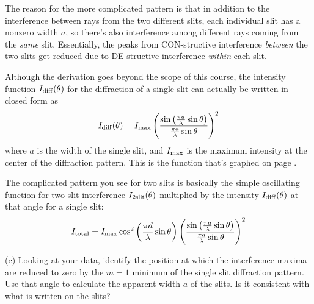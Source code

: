 The reason for the more complicated pattern is that in addition to the interference between rays from the two different slits, each individual slit has a nonzero width $a$, so there's also interference among different rays coming from the \textit{same} slit.  Essentially, the peaks from CON-structive interference \textit{between} the two slits get reduced due to DE-structive interference \textit{within} each slit.

\pagebreak[2]
Although the derivation goes beyond the scope of this course, the intensity function $I_{\rm{diff}}(\theta)$ for the diffraction of a single slit can actually be written in closed form as
\begin{displaymath} 
I_{\rm{diff}}(\theta) = I_{\rm{max}} \left( \frac {\sin \left(\frac {\pi a} {\lambda} \sin \theta \right)} {\frac {\pi a} {\lambda} \sin \theta} \right)^2 
\end{displaymath}
where $a$ is the width of the single slit, 
and $I_{\rm{max}}$
is the maximum intensity at the center of the diffraction pattern.  This is the function that's graphed on page \pageref{fraunhofer_graph}.




The complicated pattern you see for two slits is basically the simple oscillating function for two slit interference $I_{\rm 2slit}(\theta)$ multiplied by the intensity $I_{\rm{diff}}(\theta)$ at that angle for a single slit: 
\begin{displaymath} 
I_{\rm{total}} = I_{\rm{max}} \cos^2 \left (\frac {\pi d} {\lambda} \sin \theta \right) \left(\frac {\sin \left (\frac {\pi a} {\lambda} \sin \theta \right )} {\frac {\pi a} {\lambda} \sin \theta} \right)^2 \end{displaymath}

(c) Looking at your data, identify the position at which the interference maxima  are reduced to zero by the $m=1$ minimum of the single slit diffraction pattern.  Use that angle to calculate the apparent width $a$ of the slits.  Is it consistent with what is written on the slits?
\answerspace{0.5in}
